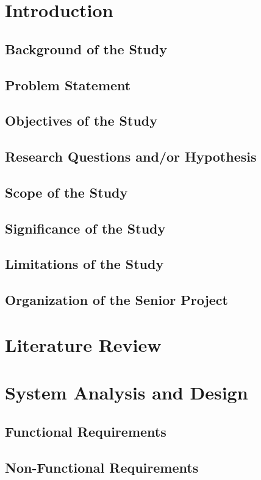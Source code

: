 \documentclass[12pt,a4paper]{report}
\begin{document}

\chapter{Introduction}
\section{Background of the Study}
\section{Problem Statement}
\section{Objectives of the Study}
\section{Research Questions and/or Hypothesis}
\section{Scope of the Study}
\section{Significance of the Study}
\section{Limitations of the Study}
\section{Organization of the Senior Project}

\chapter{Literature Review}

\chapter{System Analysis and Design}
\section{Functional Requirements}
\section{Non-Functional Requirements}
\end{document}
